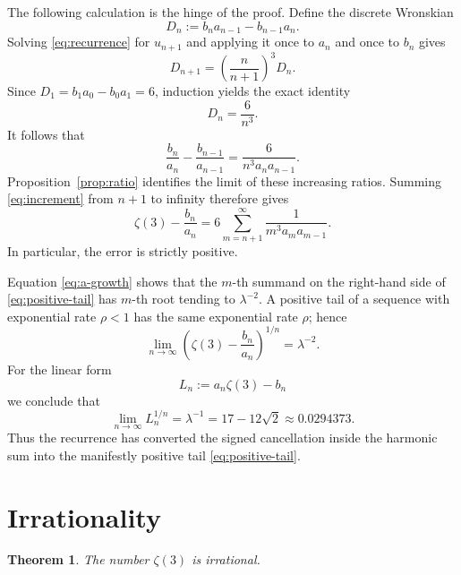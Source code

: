 \documentclass[11pt]{article}
\newtheorem{theorem}{Theorem}
\theoremstyle{remark}
\newcommand{\zetaThree}{\zeta(3)}
\begin{document}
The following calculation is the hinge of the proof.  Define the discrete
Wronskian
\[
 D_n:=b_na_{n-1}-b_{n-1}a_n.
\]
Solving \eqref{eq:recurrence} for \(u_{n+1}\) and applying it once to \(a_n\)
and once to \(b_n\) gives
\[
 D_{n+1}
 =\left(\frac{n}{n+1}\right)^3D_n.
\]
Since \(D_1=b_1a_0-b_0a_1=6\), induction yields the exact identity
\begin{equation}\label{eq:wronskian}
 \boxed{D_n=\frac6{n^3}.}
\end{equation}
It follows that
\begin{equation}\label{eq:increment}
 \frac{b_n}{a_n}-\frac{b_{n-1}}{a_{n-1}}
 =
 \frac6{n^3a_na_{n-1}}.
\end{equation}
Proposition~\ref{prop:ratio} identifies the limit of these increasing ratios.
Summing \eqref{eq:increment} from \(n+1\) to infinity therefore gives
\begin{equation}\label{eq:positive-tail}
 \boxed{
 \zetaThree-\frac{b_n}{a_n}
 =
 6\sum_{m=n+1}^{\infty}
 \frac1{m^3a_ma_{m-1}}.
 }
\end{equation}
In particular, the error is strictly positive.

Equation \eqref{eq:a-growth} shows that the \(m\)-th summand on the
right-hand side of \eqref{eq:positive-tail} has \(m\)-th root tending to
\(\lambda^{-2}\).  A positive tail of a sequence with exponential rate
\(\rho<1\) has the same exponential rate \(\rho\); hence
\[
 \lim_{n\to\infty}
 \left(\zetaThree-\frac{b_n}{a_n}\right)^{1/n}
 =\lambda^{-2}.
\]
For the linear form
\[
 L_n:=a_n\zetaThree-b_n
\]
we conclude that
\begin{equation}\label{eq:L-rate}
 \boxed{
 \lim_{n\to\infty}L_n^{1/n}
 =\lambda^{-1}
 =17-12\sqrt2
 \approx0.0294373.
 }
\end{equation}
Thus the recurrence has converted the signed cancellation inside the harmonic
sum into the manifestly positive tail \eqref{eq:positive-tail}.

\section{Irrationality}

\begin{theorem}
The number \(\zeta(3)\) is irrational.
\end{theorem}
\end{document}
